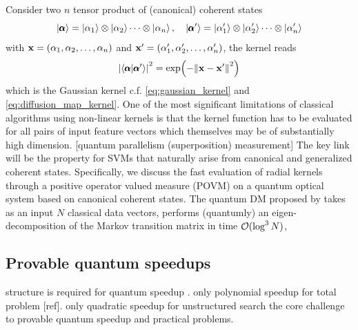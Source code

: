 Consider two $n$ tensor product of (canonical) coherent states
\begin{equation}
	\ket{\pmb{\alpha}} = \ket{\alpha_{1}} \otimes\ket{\alpha_{2}} \cdots\otimes\ket{\alpha_{n}} 
	,\quad
	\ket{\pmb{\alpha}'} = \ket{\alpha_{1}'} \otimes\ket{\alpha_{2}'} \cdots\otimes\ket{\alpha_{n}'} 
\end{equation}
with $\vb{x}=(\alpha_1,\alpha_2,\dots,\alpha_n)$ and $\vb{x}'=(\alpha_1',\alpha_2',\dots,\alpha_n')$, the kernel reads
\begin{equation}
	\abs{\braket{\pmb{\alpha}}{\pmb{\alpha}'}}^2 = 
	\exp(-\norm{\vb{x}-\vb{x}'}^2) 
\end{equation}
which is the Gaussian kernel c.f. \cref{eq:gaussian_kernel} and \cref{eq:diffusion_map_kernel}.
One of the most significant limitations of classical algorithms using non-linear kernels is that the kernel function has to be evaluated for all pairs of input feature vectors which themselves may be of substantially high dimension. [quantum parallelism (superposition) measurement]
The key link will be the  property for SVMs that naturally arise from canonical and generalized coherent states. 
Specifically, we discuss the fast evaluation of radial kernels through a positive operator valued measure (POVM) on a quantum optical system based on canonical coherent states.
\cite{chatterjeeGeneralizedCoherentStates2017}
The quantum DM proposed by \cite{sornsaengQuantumDiffusionMap2021} takes as an input $N$ classical data vectors, 
performs (quantumly) an eigen-decomposition of the Markov transition matrix in time $\mathcal{O}(\log^3 N)$, 


\subsection{Provable quantum speedups}
structure is required for quantum speedup
\cite{aaronsonNeedStructureQuantum2014}.
only polynomial speedup for total problem [ref].
only quadratic speedup for unstructured search \cite{groverQuantumMechanicsHelps1997}
the core challenge to provable quantum speedup and practical problems.

